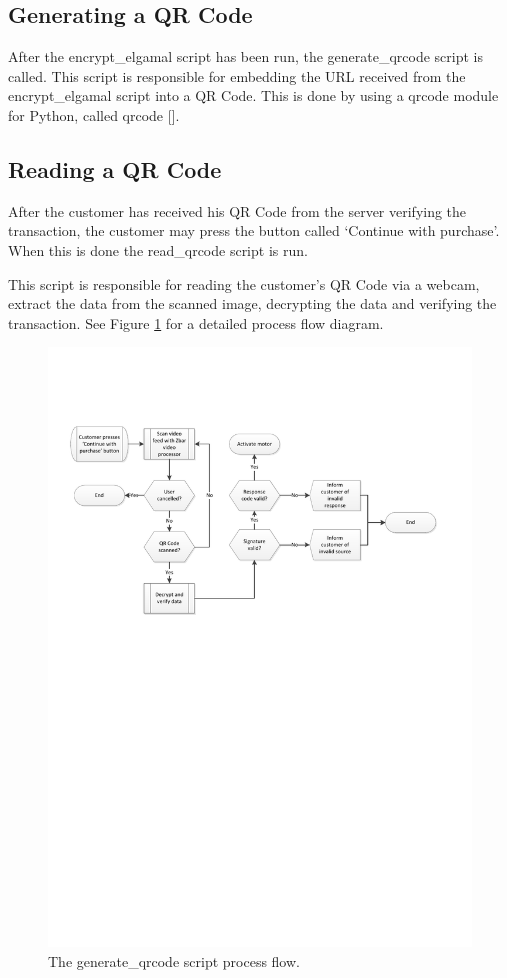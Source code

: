 \subsection{Generating a QR Code}
\label{sec:gen-qrcode}

After the encrypt\_elgamal script has been run, the generate\_qrcode script is
called. This script is responsible for embedding the URL received from the
encrypt\_elgamal script into a QR Code. This is done by using a qrcode module
for Python, called qrcode [\cite{website:qrcode-generator}].

\subsection{Reading a QR Code}

After the customer has received his QR Code from the server verifying the
transaction, the customer may press the button called `Continue with purchase'.
When this is done the read\_qrcode script is run.

This script is responsible for reading the customer's QR Code via a webcam,
extract the data from the scanned image, decrypting the data and verifying the
transaction. See Figure \ref{fig:read-qrcode-processflow} for a detailed process
flow diagram.

\begin{figure}
 \centering 
 \includegraphics[clip=true, trim
 = 0 460 0 100, scale=0.75]{read_qrcode_processflow}
 \caption{The generate\_qrcode script process flow.}
 \label{fig:read-qrcode-processflow}
\end{figure}

